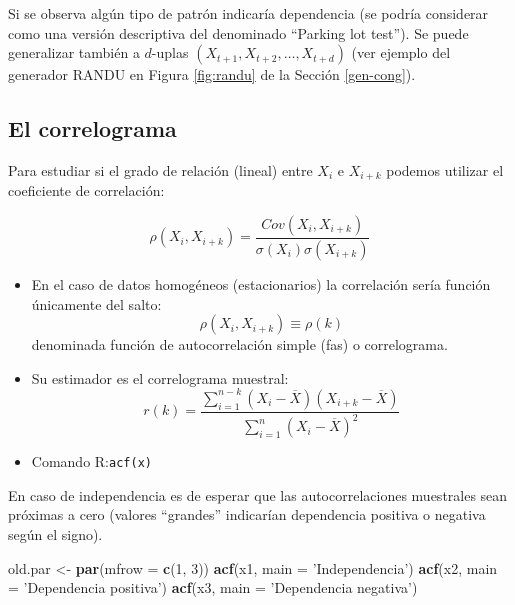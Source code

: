 \documentclass[
]{book}
\newenvironment{Shaded}{\begin{snugshade}}{\end{snugshade}}
\newcommand{\DataTypeTok}[1]{\textcolor[rgb]{0.13,0.29,0.53}{#1}}
\newcommand{\DecValTok}[1]{\textcolor[rgb]{0.00,0.00,0.81}{#1}}
\newcommand{\KeywordTok}[1]{\textcolor[rgb]{0.13,0.29,0.53}{\textbf{#1}}}
\newcommand{\NormalTok}[1]{#1}
\newcommand{\StringTok}[1]{\textcolor[rgb]{0.31,0.60,0.02}{#1}}
\theoremstyle{break}
\theoremstyle{definition}
\theoremstyle{definition}
\theoremstyle{definition}
\theoremstyle{remark}
\begin{document}
Si se observa algún tipo de patrón indicaría dependencia (se podría considerar como una versión descriptiva del denominado ``Parking lot test'').
Se puede generalizar también a \(d\)-uplas \((X_{t+1},X_{t+2},\ldots,X_{t+d})\)
(ver ejemplo del generador RANDU en Figura \ref{fig:randu} de la Sección \ref{gen-cong}).

\hypertarget{el-correlograma}{%
\subsection{El correlograma}\label{el-correlograma}}

Para estudiar si el grado de relación (lineal) entre \(X_{i}\) e
\(X_{i+k}\) podemos utilizar el coeficiente de correlación:

\[\rho\left(  X_{i},X_{i+k}\right) = \frac{Cov\left(  X_{i},X_{i+k}\right)    }
{\sigma\left(  X_{i}\right)  \sigma\left(  X_{i+k}\right)  }\]

\begin{itemize}
\item
  En el caso de datos homogéneos (estacionarios) la correlación sería función únicamente del salto:
  \[\rho\left(  X_{i},X_{i+k}\right)  \equiv\rho\left(  k\right)\]
  denominada función de autocorrelación simple (fas) o correlograma.
\item
  Su estimador es el correlograma muestral:
  \[r(k)=\frac{\sum_{i=1}^{n-k}(X_{i}-\overline{X})(X_{i+k}-\overline{X})}
  {\sum_{i=1}^{n}(X_{i}-\overline{X})^{2}}\]
\item
  Comando R:\texttt{acf(x)}
\end{itemize}

En caso de independencia es de esperar que las autocorrelaciones
muestrales sean próximas a cero (valores ``grandes'' indicarían
dependencia positiva o negativa según el signo).

\begin{Shaded}
\begin{Highlighting}[]
\NormalTok{old.par <-}\StringTok{ }\KeywordTok{par}\NormalTok{(}\DataTypeTok{mfrow =} \KeywordTok{c}\NormalTok{(}\DecValTok{1}\NormalTok{, }\DecValTok{3}\NormalTok{))}
\KeywordTok{acf}\NormalTok{(x1, }\DataTypeTok{main =} \StringTok{'Independencia'}\NormalTok{)}
\KeywordTok{acf}\NormalTok{(x2, }\DataTypeTok{main =} \StringTok{'Dependencia positiva'}\NormalTok{)}
\KeywordTok{acf}\NormalTok{(x3, }\DataTypeTok{main =} \StringTok{'Dependencia negativa'}\NormalTok{)}
\end{Highlighting}
\end{Shaded}
\end{document}
